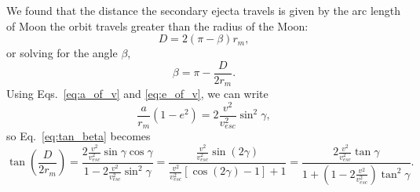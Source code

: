 \documentclass{hitec}
\numberwithin{equation}{section}
\begin{document}
We found that the distance the secondary ejecta travels is given by the arc length of Moon the orbit travels greater than the radius of the Moon:
\begin{equation}\label{eq:D}
D = 2(\pi-\beta)r_m,
\end{equation}
or solving for the angle $\beta$,
\begin{equation}
\beta = \pi - \frac{D}{2r_m}.
\end{equation}
Using Eqs.\ \ref{eq:a_of_v} and \ref{eq:e_of_v}, we can write
\begin{equation}
\frac{a}{r_m}(1-e^2) = 2\frac{v^2}{v_{esc}^2}\sin^2\gamma,
\end{equation}
so Eq.\ \ref{eq:tan_beta} becomes \citep[c.f., Eq.\ (1) of][]{vickery1986size}
\begin{equation}\label{eq:ejecta_distance}
\tan\left(\frac{D}{2r_m}\right) = \frac{2\frac{v^2}{v_{esc}^2}\sin\gamma\cos\gamma}{1-2\frac{v^2}{v_{esc}^2}\sin^2\gamma} = \frac{\frac{v^2}{v_{esc}^2}\sin(2\gamma)}{\frac{v^2}{v_{esc}^2}[\cos(2\gamma)-1]+1}
=\frac{2\frac{v^2}{v_{esc}^2}\tan\gamma}{1+(1-2\frac{v^2}{v_{esc}^2})\tan^2\gamma}.
\end{equation}
\end{document}

